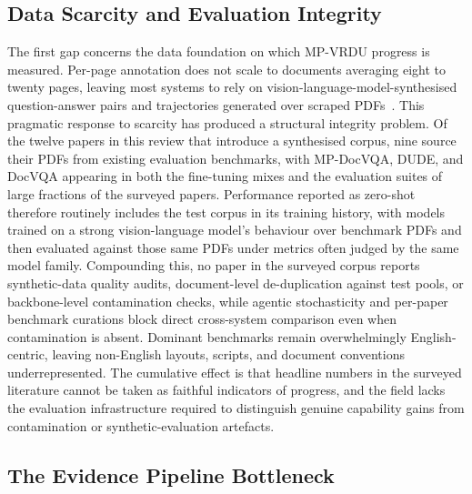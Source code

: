 \documentclass[11pt]{article}
\begin{document}
\subsection{Data Scarcity and Evaluation Integrity}
\label{sec:gap-data}

The first gap concerns the data foundation on which MP-VRDU progress is measured. Per-page annotation does not scale to documents averaging eight to twenty pages, leaving most systems to rely on vision-language-model-synthesised question-answer pairs and trajectories generated over scraped PDFs~\cite{tanaka2024instructdoc,jain2025simpledoc,xiong2026docr1,zhang2026docdancer}. This pragmatic response to scarcity has produced a structural integrity problem. Of the twelve papers in this review that introduce a synthesised corpus, nine source their PDFs from existing evaluation benchmarks, with MP-DocVQA, DUDE, and DocVQA appearing in both the fine-tuning mixes and the evaluation suites of large fractions of the surveyed papers. Performance reported as zero-shot therefore routinely includes the test corpus in its training history, with models trained on a strong vision-language model's behaviour over benchmark PDFs and then evaluated against those same PDFs under metrics often judged by the same model family. Compounding this, no paper in the surveyed corpus reports synthetic-data quality audits, document-level de-duplication against test pools, or backbone-level contamination checks, while agentic stochasticity and per-paper benchmark curations block direct cross-system comparison even when contamination is absent. Dominant benchmarks remain overwhelmingly English-centric, leaving non-English layouts, scripts, and document conventions underrepresented. The cumulative effect is that headline numbers in the surveyed literature cannot be taken as faithful indicators of progress, and the field lacks the evaluation infrastructure required to distinguish genuine capability gains from contamination or synthetic-evaluation artefacts.

\subsection{The Evidence Pipeline Bottleneck}
\label{sec:gap-evidence}
\end{document}
